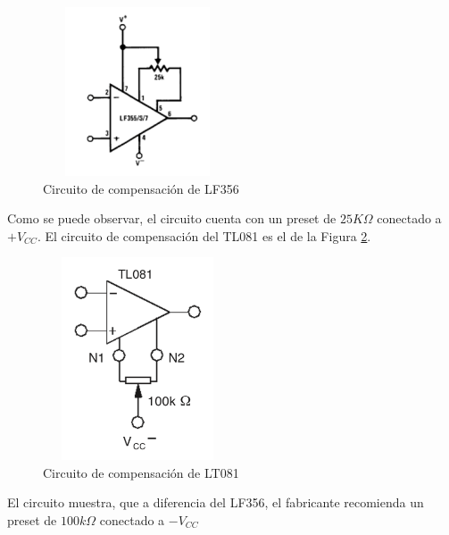 \begin{figure}[ht]                                                       
    \centering\includegraphics[width=0.5\textwidth, height=5cm]{../Ex3/Figuras/fig_6.png}
     \caption{Circuito de compensación de LF356}
     \label{compensacion_LF356}
     \end{figure}

Como se puede observar, el circuito cuenta con un preset de $25K\Omega$ conectado a $+V_{CC}$. El circuito de compensación del TL081 es el 
de la Figura \ref{compensacion_LT081}.


\begin{figure}[h!]                                                       
    \centering\includegraphics[width=0.5\textwidth, height=6cm]{../Ex3/Figuras/fig_7.png}

    \caption{Circuito de compensación de LT081}
     \label{compensacion_LT081}
     \end{figure}

 
El circuito muestra, que a diferencia del LF356, el fabricante recomienda un preset de $100k\Omega$ conectado a $-V_{CC}$

